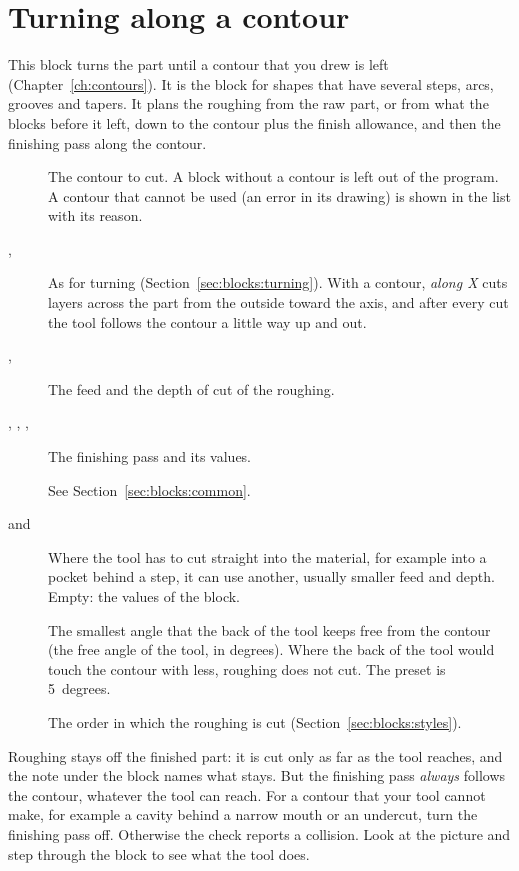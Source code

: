 \section{Turning along a contour}\label{sec:blocks:contour}


This block turns the part until a contour that you drew is left (Chapter~\ref{ch:contours}). It is the block for shapes that have several steps, arcs, grooves and tapers. It plans the roughing from the raw part, or from what the blocks before it left, down to the contour plus the finish allowance, and then the finishing pass along the contour.

\begin{description}
\item[] The contour to cut. A block without a contour is left out of the program. A contour that cannot be used (an error in its drawing) is shown in the list with its reason.
\item[, ] As for turning (Section~\ref{sec:blocks:turning}). With a contour, \emph{along X} cuts layers across the part from the outside toward the axis, and after every cut the tool follows the contour a little way up and out.
\item[, ] The feed and the depth of cut of the roughing.
\item[, , , ] The finishing pass and its values.
\item[] See Section~\ref{sec:blocks:common}.
\item[ and ] Where the tool has to cut straight into the material, for example into a pocket behind a step, it can use another, usually smaller feed and depth. Empty: the values of the block.
\item[] The smallest angle that the back of the tool keeps free from the contour (the free angle of the tool, in degrees). Where the back of the tool would touch the contour with less, roughing does not cut. The preset is 5~degrees.
\item[] The order in which the roughing is cut (Section~\ref{sec:blocks:styles}).
\end{description}

\begin{notebox}
Roughing stays off the finished part: it is cut only as far as the tool reaches, and the note under the block names what stays. But the finishing pass \emph{always} follows the contour, whatever the tool can reach. For a contour that your tool cannot make, for example a cavity behind a narrow mouth or an undercut, turn the finishing pass off. Otherwise the check reports a collision. Look at the picture and step through the block to see what the tool does.
\end{notebox}

